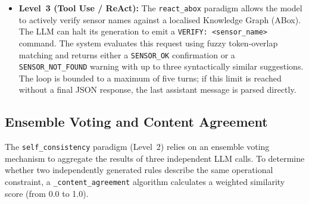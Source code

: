 \documentclass[11pt]{article}
\begin{document}
\begin{itemize}
          \texttt{reflexion\_guided} use the \texttt{graph\_informed} system prompt
          as their conversational base, inheriting its mandatory sensor-naming
          constraints, whereas \texttt{self\_consistency} uses the simpler
          \texttt{naive} base without those constraints.
          The \texttt{reflexion} strategy utilises a two-turn loop in which the model
          critiques its own initial output for missing rules, imprecise or incorrect
          numeric conditions, wrong sensor and station names, and duplicate or
          poorly-structured entries.
          The \texttt{reflexion\_guided} paradigm extends this to three turns,
          adding a rigid domain-specific checklist in the final turn that covers
          six categories: (1)~completeness across all stations, (2)~cross-station
          dependencies, (3)~temporal anomaly patterns (SPIKE, DRIFT, STUCK,
          OUT\_OF\_RANGE, CORRELATED), (4)~predictive and corrective maintenance
          protocols (MAINT-01 to MAINT-08), (5)~access-control and zone-occupancy
          rules, and (6)~correctness of all numeric threshold values.
    \item \textbf{Level~3 (Tool Use / ReAct):} The \texttt{react\_abox} paradigm
          allows the model to actively verify sensor names against a localised
          Knowledge Graph (ABox). The LLM can halt its generation to emit a
          \texttt{VERIFY: <sensor\_name>} command. The system evaluates this request
          using fuzzy token-overlap matching and returns either a \texttt{SENSOR\_OK}
          confirmation or a \texttt{SENSOR\_NOT\_FOUND} warning with up to three
          syntactically similar suggestions. The loop is bounded to a maximum of
          five turns; if this limit is reached without a final JSON response, the
          last assistant message is parsed directly.
\end{itemize}

\subsection{Ensemble Voting and Content Agreement}
\label{sec:ensemble}
The \texttt{self\_consistency} paradigm (Level~2) relies on an ensemble voting
mechanism to aggregate the results of three independent LLM calls. To determine
whether two independently generated rules describe the same operational constraint,
a \texttt{\_content\_agreement} algorithm calculates a weighted similarity score
(from 0.0 to 1.0).
\end{document}
